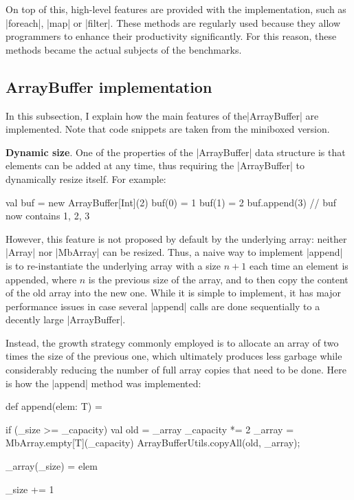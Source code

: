On top of this, high-level features are provided with the implementation, such as |foreach|, |map| or |filter|. These methods are regularly used because they allow programmers to enhance their productivity significantly. For this reason, these methods became the actual subjects of the benchmarks.

\subsection{ArrayBuffer implementation}

In this subsection, I explain how the main features of the\linebreak |ArrayBuffer| are implemented. Note that code snippets are taken from the miniboxed version.

\textbf{Dynamic size}. One of the properties of the |ArrayBuffer| data structure is that elements can be added at any time, thus requiring the |ArrayBuffer| to dynamically resize itself. For example: 

\begin{lstlisting-nobreak}
val buf = new ArrayBuffer[Int](2)
buf(0) = 1
buf(1) = 2
buf.append(3) // buf now contains {1, 2, 3}
\end{lstlisting-nobreak}

However, this feature is not proposed by default by the underlying array: neither |Array| nor |MbArray| can be resized. Thus, a naive way to implement |append| is to re-instantiate the underlying array with a size $n + 1$ each time an element is appended, where $n$ is the previous size of the array, and to then copy the content of the old array into the new one.
While it is simple to implement, it has major performance issues in case several |append| calls are done sequentially to a decently large |ArrayBuffer|.

Instead, the growth strategy commonly employed is to allocate an array of two times the size of the previous one, which ultimately produces less garbage while considerably reducing the number of full array copies that need to be done. Here is how the |append| method was implemented:

\begin{lstlisting-nobreak}
def append(elem: T) = {
  if (_size >= _capacity) {
    val old = _array
    _capacity *= 2
    _array = MbArray.empty[T](_capacity)
    ArrayBufferUtils.copyAll(old, _array);
  }

  _array(_size) = elem

  _size += 1
}
\end{lstlisting-nobreak}

